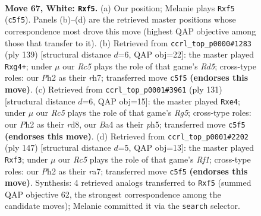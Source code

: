 \documentclass[11pt]{article}
\begin{document}
\clearpage

\begin{figure}[p]\centering
\begin{subfigure}{0.46\textwidth}\centering
\resizebox{\linewidth}{!}{%
\newchessgame
\chessboard[
  setfen={8/8/k7/2R2p2/B4P2/4K3/7P/8 w - - 5 67},
  showmover=false,
  pgfstyle=straightmove, color=movearrow, markmove={c5-f5}
]}
\caption{}
\end{subfigure}\hfill
\begin{subfigure}{0.46\textwidth}\centering
\resizebox{\linewidth}{!}{%
\newchessgame
\chessboard[
  setfen={8/7R/5k2/6p1/3r2P1/8/6K1/8 b - - 12 70},
  showmover=false,
  pgfstyle=straightmove, color=movearrow, markmove={d4-g4}
]}
\caption{}
\end{subfigure}
\\[4pt]
\begin{subfigure}{0.46\textwidth}\centering
\resizebox{\linewidth}{!}{%
\newchessgame
\chessboard[
  setfen={3R4/7K/8/2k4P/2p1P1r1/8/8/8 b - - 11 66},
  showmover=false,
  pgfstyle=straightmove, color=movearrow, markmove={g4-e4}
]}
\caption{}
\end{subfigure}\hfill
\begin{subfigure}{0.46\textwidth}\centering
\resizebox{\linewidth}{!}{%
\newchessgame
\chessboard[
  setfen={5r2/R7/8/6k1/7p/5P2/7K/8 b - - 7 74},
  showmover=false,
  pgfstyle=straightmove, color=movearrow, markmove={f8-f3}
]}
\caption{}
\end{subfigure}
\caption{\textbf{Move 67, White: \texttt{Rxf5}.} (a) Our position; Melanie plays \texttt{Rxf5} (\texttt{c5f5}). Panels (b)--(d) are the retrieved master positions whose correspondence most drove this move (highest QAP objective among those that transfer to it). (b) Retrieved from \texttt{ccrl\_top\_p0000\#1283} (ply 139) [structural distance $d$=6, QAP obj=22]: the master played \texttt{Rxg4+}; under $\mu$ our \emph{Rc5} plays the role of that game's \emph{Rd5}; cross-type roles: our \emph{P}h2 as their \emph{r}h7; transferred move \texttt{c5f5} \textbf{(endorses this move)}. (c) Retrieved from \texttt{ccrl\_top\_p0001\#3961} (ply 131) [structural distance $d$=6, QAP obj=15]: the master played \texttt{Rxe4}; under $\mu$ our \emph{Rc5} plays the role of that game's \emph{Rg5}; cross-type roles: our \emph{P}h2 as their \emph{r}d8, our \emph{B}a4 as their \emph{p}h5; transferred move \texttt{c5f5} \textbf{(endorses this move)}. (d) Retrieved from \texttt{ccrl\_top\_p0001\#2202} (ply 147) [structural distance $d$=5, QAP obj=13]: the master played \texttt{Rxf3}; under $\mu$ our \emph{Rc5} plays the role of that game's \emph{Rf1}; cross-type roles: our \emph{P}h2 as their \emph{r}a7; transferred move \texttt{c5f5} \textbf{(endorses this move)}. Synthesis: 4 retrieved analogs transferred to \texttt{Rxf5} (summed QAP objective 62, the strongest correspondence among the candidate moves); Melanie committed it via the \texttt{search} selector.}
\label{fig:thought-m132}
\end{figure}
\end{document}
